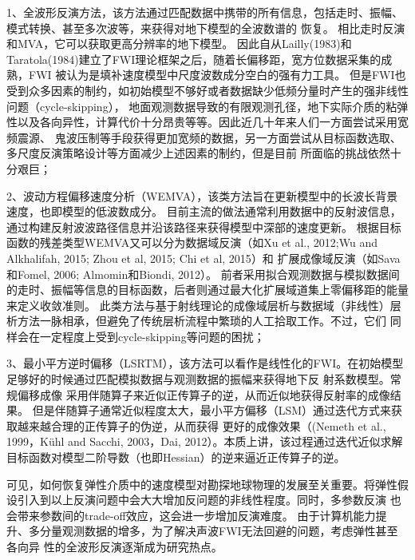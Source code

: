 1、全波形反演方法，该方法通过匹配数据中携带的所有信息，包括走时、振幅、模式转换、甚至多次波等，来获得对地下模型的全波数谱的
恢复。
相比走时反演和MVA，它可以获取更高分辨率的地下模型。
因此自从Lailly(1983)\cite{lailly1983seismic}和Taratola(1984)\cite{tarantola1984}建立了FWI理论框架之后，随着长偏移距，宽方位数据采集的成熟，FWI
被认为是填补速度模型中尺度波数成分空白的强有力工具。
但是FWI也受到众多因素的制约，如初始模型不够好或者数据缺少低频分量时产生的强非线性问题（cycle-skipping），
地面观测数据导致的有限观测孔径，地下实际介质的粘弹性以及各向异性，计算代价十分昂贵等等。因此近几十年来人们一方面尝试采用宽频震源、
鬼波压制等手段获得更加宽频的数据，另一方面尝试从目标函数选取、多尺度反演策略设计等方面减少上述因素的制约，但是目前
所面临的挑战依然十分艰巨；

2、波动方程偏移速度分析（WEMVA），该类方法旨在更新模型中的长波长背景速度，也即模型的低波数成分。
目前主流的做法通常利用数据中的反射波信息，通过构建反射波波路径信息并沿该路径来获得模型中深部的速度更新。
根据目标函数的残差类型WEMVA又可以分为数据域反演（如Xu et al., 2012\cite{xu:2012};Wu and Alkhalifah,
2015\cite[]{Wu2015b}; Zhou et al, 
2015\cite[]{zhou:2015}; Chi et al, 2015\cite{chi2015}）和
扩展成像域反演（如Sava和Fomel, 2006\cite{Sava2006}; Almomin和Biondi, 2012\cite{Almomin2012}）。
前者采用拟合观测数据与模拟数据间的走时、振幅等信息的目标函数，后者则通过最大化扩展域道集上零偏移距的能量来定义收敛准则。
此类方法与基于射线理论的成像域层析与数据域（非线性）层析方法一脉相承，但避免了传统层析流程中繁琐的人工拾取工作。不过，它们
同样会在一定程度上受到cycle-skipping等问题的困扰；

3、最小平方逆时偏移（LSRTM），该方法可以看作是线性化的FWI。在初始模型足够好的时候通过匹配模拟数据与观测数据的振幅来获得地下反
射系数模型。常规偏移成像
采用伴随算子来近似正传算子的逆，从而近似地获得反射率的成像结果。
但是伴随算子通常近似程度太大，最小平方偏移（LSM）通过迭代方式来获取越来越合理的正传算子的伪逆，从而获得
更好的成像效果（(Nemeth et al., 1999\cite{Nemeth1999}，Kühl and Sacchi\cite{KuehlEtAl2003}, 2003，Dai,
2012\cite{DaiEtAl2012}）。本质上讲，该过程通过迭代近似求解目标函数对模型二阶导数（也即Hessian）的逆来逼近正传算子的逆。

可见，如何恢复弹性介质中的速度模型对勘探地球物理的发展至关重要。将弹性假设引入到以上反演问题中会大大增加反问题的非线性程度。同时，多参数反演
也会带来参数间的trade-off效应，这会进一步增加反演难度。
由于计算机能力提升、多分量观测数据的增多，为了解决声波FWI无法回避的问题，考虑弹性甚至各向异
性的全波形反演逐渐成为研究热点。

